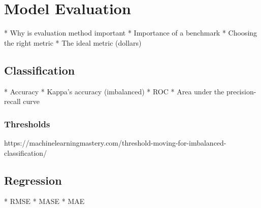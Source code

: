 \documentclass[../../main.tex]{subfiles}
\begin{document}

\section{Model Evaluation}
* Why is evaluation method important
* Importance of a benchmark
* Choosing the right metric
* The ideal metric (dollars)

\subsection{Classification}
* Accuracy
* Kappa's accuracy (imbalanced)
* ROC
* Area under the precision-recall curve

\subsubsection{Thresholds}
https://machinelearningmastery.com/threshold-moving-for-imbalanced-classification/

\subsection{Regression}
* RMSE
* MASE
* MAE

\end{document}
